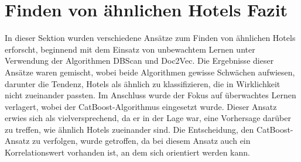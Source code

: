 \section{Finden von ähnlichen Hotels Fazit}
\label{subsec:similar_fazit}
In dieser Sektion wurden verschiedene Ansätze zum Finden von ähnlichen Hotels erforscht, beginnend mit dem Einsatz von unbewachtem Lernen unter Verwendung der Algorithmen DBScan und Doc2Vec. Die Ergebnisse dieser Ansätze waren gemischt, wobei beide Algorithmen gewisse Schwächen aufwiesen, darunter die Tendenz, Hotels als ähnlich zu klassifizieren, die in Wirklichkeit nicht zueinander passten.
\newline
\newline
Im Anschluss wurde der Fokus auf überwachtes Lernen verlagert, wobei der CatBoost-Algorithmus eingesetzt wurde. Dieser Ansatz erwies sich als vielversprechend, da er in der Lage war, eine Vorhersage darüber zu treffen, wie ähnlich Hotels zueinander sind. Die Entscheidung, den CatBoost-Ansatz zu verfolgen, wurde getroffen, da bei diesem Ansatz auch ein Korrelationswert vorhanden ist, an dem sich orientiert werden kann.
